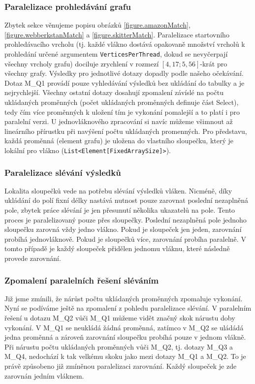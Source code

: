 \subsubsection{Paralelizace prohledávání grafu}

Zbytek sekce věnujeme popisu obrázků \ref{figure.amazonMatch}, \ref{figure.webberkstanMatch} a \ref{figure.skitterMatch}. 
Paralelizace startovního prohledávacího vrcholu (tj. každé vlákno dostává opakovaně množství vrcholů k prohledání určené argumentem \verb+VerticesPerThread+, dokud se nevyčerpají všechny vrcholy grafu) dociluje zrychlení v rozmezí $[4,17; 5,56]$-krát pro všechny grafy.
Výsledky pro jednotlivé dotazy dopadly podle našeho očekávání. 
Dotaz M\_Q1 provádí pouze vyhledávání výsledků bez ukládání do tabulky a je nejrychlejší. 
Všechny ostatní dotazy dosahují zpomalení závíslé na počtu ukládaných proměnných (počet ukládaných proměnných definuje část Select), tedy čím více proměnných k uložení tím je vykonání pomalejší a to platí i pro paralelní verzi. 
U jednovláknového zpracování si navíc můžeme všimnout až lineárního přírustku při navýšení počtu ukládaných promenných.
Pro představu, každá proměnná (element grafu) je uložena do vlastního sloupečku, který je lokální pro vlákno (\verb+List<Element[FixedArraySize]>+). 

\subsubsection{Paralelizace slévání výsledků}

Lokalita sloupečků vede na potřebu slévání výsledků vláken.
Nicméně, díky ukládání do polí fixní délky nastává nutnost pouze zarovnat poslední nezaplněná pole, zbytek práce slévání je jen přesunutí několika ukazatelů na pole. 
Tento proces je paralelizovaný pouze přes sloupečky.
Poslední nezaplněná pole jednoho sloupečku zarovná vždy jedno vlákno.
Pokud je sloupeček jen jeden, zarovnání probíhá jednovláknově.
Pokud je sloupečků více, zarovnání probíha paralelně.
V tomto případě je každý sloupeček přidělen jednomu vláknu, které následně provede zarovnání. 

\subsubsection{Zpomalení paralelních řešení sléváním}

Již jsme zmínili, že nárůst počtu ukládaných proměnných zpomaluje vykonání.
Nyní se podíváme ještě na zpomalení z pohledu paralelizace slévání.
V paralelním řešení u dotazu M\_Q2 vůči M\_Q1 můžeme vidět značný skok nárustu doby vykonání.
V M\_Q1 se neukládá žádná proměnná, zatímco v M\_Q2 se uládádá jedna proměnná a zároveň zarovnání sloupečku probíhá pouze v jednom vlákně.
Při nárustu počtu ukládaných proměnných vůči M\_Q2, tj. dotazy M\_Q3 a M\_Q4, nedochází k tak velkému skoku jako mezi dotazy M\_Q1 a M\_Q2.
To je právě způsobeno již zmíněnou paralelizaci zarovnání.
Každý sloupeček je zde zarovnán jedním vláknem.  

